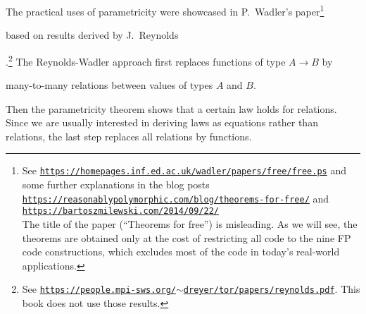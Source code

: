 The practical uses of parametricity were showcased in P.~Wadler\textsf{'}s
paper\footnote{See \texttt{\href{https://homepages.inf.ed.ac.uk/wadler/papers/free/free.ps}{https://homepages.inf.ed.ac.uk/wadler/papers/free/free.ps}}
and some further explanations in the blog posts \texttt{\href{https://reasonablypolymorphic.com/blog/theorems-for-free/}{https://reasonablypolymorphic.com/blog/theorems-for-free/}}
and \texttt{\href{https://bartoszmilewski.com/2014/09/22/}{https://bartoszmilewski.com/2014/09/22/}}\\
The title of the paper (\textsf{``}Theorems for free\textsf{''})
is misleading. As we will see, the theorems are obtained only at the
cost of restricting all code to the nine FP code constructions, which
excludes most of the code in today\textsf{'}s real-world applications.} %
\begin{comment}
that was 
\end{comment}
based on results derived by J.~Reynolds%
\begin{comment}
in 1983
\end{comment}
.\footnote{See \texttt{\href{https://people.mpi-sws.org/~dreyer/tor/papers/reynolds.pdf}{https://people.mpi-sws.org/$\sim$dreyer/tor/papers/reynolds.pdf}}.
This book does not use those results. } The Reynolds-Wadler approach first replaces functions of type $A\rightarrow B$
by%
\begin{comment}
one first replaces functions by
\end{comment}
{} many-to-many relations between values of types $A$ and $B$.%
\begin{comment}
One needs to learn how to work with such relations.
\end{comment}
{} Then the parametricity theorem shows that a certain law holds for
relations. Since we are usually interested in deriving laws as equations
rather than relations, the last step replaces all relations by functions.

